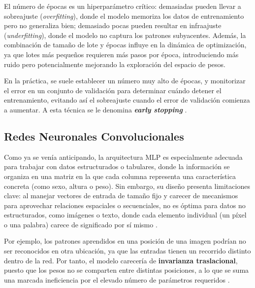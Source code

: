 \begin{itemize}
    El número de épocas es un hiperparámetro crítico: demasiadas pueden llevar a sobreajuste 
    (\textit{overfitting}), donde el modelo memoriza los datos de entrenamiento pero no generaliza bien; 
    demasiado pocas pueden resultar en infraajuste (\textit{underfitting}), donde el modelo no captura los 
    patrones subyacentes. Además, la combinación de tamaño de lote y épocas influye en la dinámica de 
    optimización, ya que lotes más pequeños requieren más pasos por época, introduciendo más ruido pero 
    potencialmente mejorando la exploración del espacio de pesos.

    En la práctica, se suele establecer un número muy alto de épocas, y monitorizar el error en un conjunto de
    validación para determinar cuándo detener el entrenamiento, evitando así el sobreajuste cuando el error de
    validación comienza a aumentar. A esta técnica se le denomina \textbf{\textit{early stopping}} 
    \cite{goodfellow2016}.
    
\end{itemize}



\subsection{Redes Neuronales Convolucionales}

Como ya se venía anticipando, la arquitectura \acrshort{MLP} es especialmente adecuada para trabajar con datos estructurados o tabulares, donde la información se organiza en una matriz en la que cada columna representa una característica concreta (como sexo, altura o peso). Sin embargo, su diseño presenta limitaciones clave: al manejar vectores de entrada de tamaño fijo y carecer de mecanismos para aprovechar relaciones espaciales o secuenciales, no es óptima para datos no estructurados, como imágenes o texto, donde cada elemento individual (un píxel o una palabra) carece de significado por sí mismo \cite{murphy2022}.

Por ejemplo, los patrones aprendidos en una posición de una imagen podrían no ser reconocidos en otra ubicación, ya que las entradas tienen un recorrido distinto dentro de la red. Por tanto, el modelo carecería       %
de \textbf{invarianza traslacional}, puesto que los pesos no se comparten entre distintas posiciones, a lo que 
se suma una marcada ineficiencia por el elevado número de parámetros requeridos \cite{szeliski2010}.

